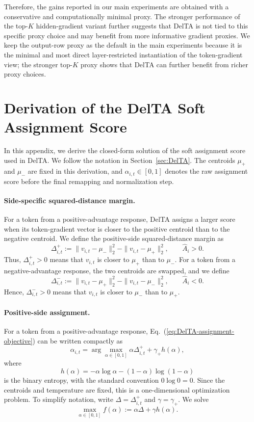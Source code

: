 \documentclass{llmxive}
\providecommand{\Eq}[1]{Eq.~(\ref{#1})}
\begin{document}
Therefore, the gains reported in our main experiments are obtained with a
conservative and computationally minimal proxy. The stronger performance of the
top-\(K\) hidden-gradient variant further suggests that DelTA is not tied to this
specific proxy choice and may benefit from more informative gradient proxies. We keep the output-row proxy as the default in the main experiments because it is the minimal and most direct layer-restricted instantiation of the token-gradient view; the stronger top-\(K\) proxy shows that DelTA can further benefit from richer proxy choices.

\section{Derivation of the DelTA Soft Assignment Score}
\label{app:DelTA-weight-derivation}

In this appendix, we derive the closed-form solution of the soft assignment
score used in DelTA. We follow the notation in Section~\ref{sec:DelTA}. The
centroids \(\mu_+\) and \(\mu_-\) are fixed in this derivation, and
\(\alpha_{i,t}\in[0,1]\) denotes the raw assignment score before the final
remapping and normalization step.

\paragraph{Side-specific squared-distance margin.}
For a token from a positive-advantage response, DelTA assigns a larger score
when its token-gradient vector is closer to the positive centroid than to the
negative centroid. We define the positive-side squared-distance margin as
\[
\Delta_{i,t}^{+}
:=
\|v_{i,t}-\mu_-\|_2^2
-
\|v_{i,t}-\mu_+\|_2^2,
\qquad
\hat A_i>0.
\]
Thus, \(\Delta_{i,t}^{+}>0\) means that \(v_{i,t}\) is closer to \(\mu_+\) than
to \(\mu_-\). For a token from a negative-advantage response, the two centroids
are swapped, and we define
\[
\Delta_{i,t}^{-}
:=
\|v_{i,t}-\mu_+\|_2^2
-
\|v_{i,t}-\mu_-\|_2^2,
\qquad
\hat A_i<0.
\]
Hence, \(\Delta_{i,t}^{-}>0\) means that \(v_{i,t}\) is closer to \(\mu_-\) than
to \(\mu_+\).

\paragraph{Positive-side assignment.}
For a token from a positive-advantage response,
\Eq{eq:DelTA-assignment-objective} can be written compactly as
\[
\alpha_{i,t}
=
\arg\max_{\alpha\in[0,1]}
\alpha \Delta_{i,t}^{+}
+
\gamma_+ h(\alpha),
\]
where
\[
h(\alpha)
=
-\alpha\log\alpha-(1-\alpha)\log(1-\alpha)
\]
is the binary entropy, with the standard convention \(0\log 0=0\). Since the
centroids and temperature are fixed, this is a one-dimensional optimization
problem. To simplify notation, write
\(\Delta=\Delta_{i,t}^{+}\) and \(\gamma=\gamma_+\). We solve
\[
\max_{\alpha\in[0,1]}
f(\alpha)
:=
\alpha\Delta+\gamma h(\alpha).
\]
\end{document}
